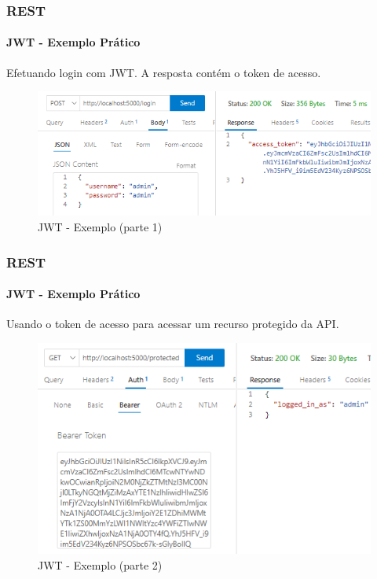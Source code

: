 \documentclass[
	9pt, %
	t, %
]{beamer}
\begin{document}
\begin{frame}
	\frametitle{REST}
	\framesubtitle{JWT - Exemplo Prático}

	\centering
	Efetuando login com JWT. A resposta contém o token de acesso.

	\begin{figure}
		\includegraphics[width=0.9\linewidth]{jwt-1.png}
		\caption{JWT - Exemplo (parte 1)}
		\label{fig:jwt_example1}
	\end{figure}

\end{frame}

\begin{frame}
	\frametitle{REST}
	\framesubtitle{JWT - Exemplo Prático}

	\centering
	Usando o token de acesso para acessar um recurso protegido da API.

	\begin{figure}
		\includegraphics[width=0.9\linewidth]{jwt-2.png}
		\caption{JWT - Exemplo (parte 2)}
		\label{fig:jwt_example2}
	\end{figure}

\end{frame}
\end{document}
